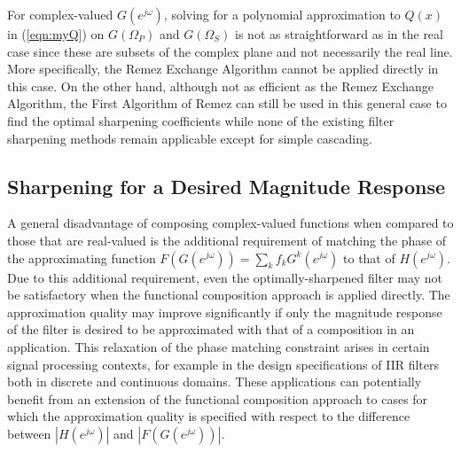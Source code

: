 \documentclass[journal] {IEEEtran}
\begin{document}
For complex-valued $G(e^{j\omega})$, solving for a polynomial approximation to $Q(x)$ in (\ref{eqn:myQ}) on $G(\Omega_P)$ and $G(\Omega_S)$ is not as straightforward as in the real case since these are subsets of the complex plane and not necessarily the real line. More specifically, the Remez Exchange Algorithm cannot be applied directly in this case. On the other hand, although not as efficient as the Remez Exchange Algorithm, the First Algorithm of Remez can still be used in this general case to find the optimal sharpening coefficients while none of the existing filter sharpening methods remain applicable except for simple cascading.


\subsection{Sharpening for a Desired Magnitude Response}
A general disadvantage of composing complex-valued functions when compared to those that are real-valued is the additional requirement of matching the phase of the approximating function $F(G(e^{j\omega}))=\sum_k f_kG^k(e^{j\omega})$ to that of $H(e^{j\omega})$. Due to this additional requirement, even the optimally-sharpened filter may not be satisfactory when the functional composition approach is applied directly. The approximation quality may improve significantly if only the magnitude response of the filter is desired to be approximated with that of a composition in an application. This relaxation of the phase matching constraint arises in certain signal processing contexts, for example in the design specifications of IIR filters both in discrete and continuous domains. These applications can potentially benefit from an extension of the functional composition approach to cases for which the approximation quality is specified with respect to the difference between $|H(e^{j\omega})|$ and $|F(G(e^{j\omega}))|$.
\end{document}
